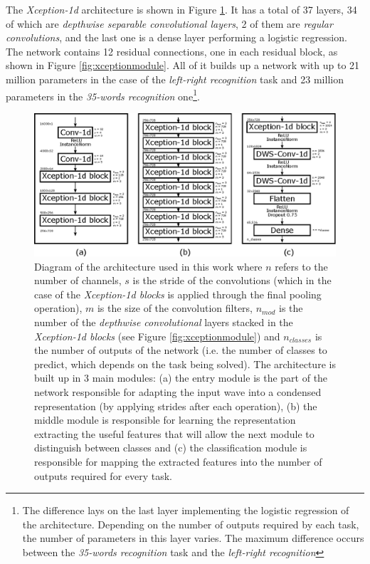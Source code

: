 The \textit{Xception-1d} architecture is shown in Figure \ref{fig:arch}. It has a total of 37 layers, 34 of which are \textit{depthwise separable convolutional layers}, 2 of them are \textit{regular convolutions}, and the last one is a dense layer performing a logistic regression. The network contains 12 residual connections, one in each residual block, as shown in Figure \ref{fig:xceptionmodule}. All of it builds up a network with up to 21 million parameters in the case of the \textit{left-right recognition}  task and 23 million parameters in the \textit{35-words recognition} one\footnote{The difference lays on the last layer implementing the logistic regression of the architecture. Depending on the number of outputs required by each task, the number of parameters in this layer varies. The maximum difference occurs between the \textit{35-words recognition} task and the \textit{left-right recognition}}.

\begin{figure}[ht]
	\centering
	\includegraphics[width=1.0\linewidth]{kws/images/arch.eps}
	\caption{Diagram of the architecture used in this work where $n$ refers to the number of channels, $s$ is the stride of the convolutions (which in the case of the \textit{Xception-1d blocks} is applied through the final pooling operation), $m$ is the size of the convolution filters, $n_{mod}$ is the number of the \textit{depthwise convolutional} layers stacked in the \textit{Xception-1d blocks} (see Figure \ref{fig:xceptionmodule}) and $n_{classes}$ is the number of outputs of the network (i.e. the number of classes to predict, which depends on the task being solved). The architecture is built up in 3 main modules: (a) the entry module is the part of the network responsible for adapting the input wave into a condensed representation (by applying strides after each operation), (b) the middle module is responsible for learning the representation extracting the useful features that will allow the next module to distinguish between classes and (c) the classification module is responsible for mapping the extracted features into the number of outputs required for every task.}
	\label{fig:arch}
\end{figure}


